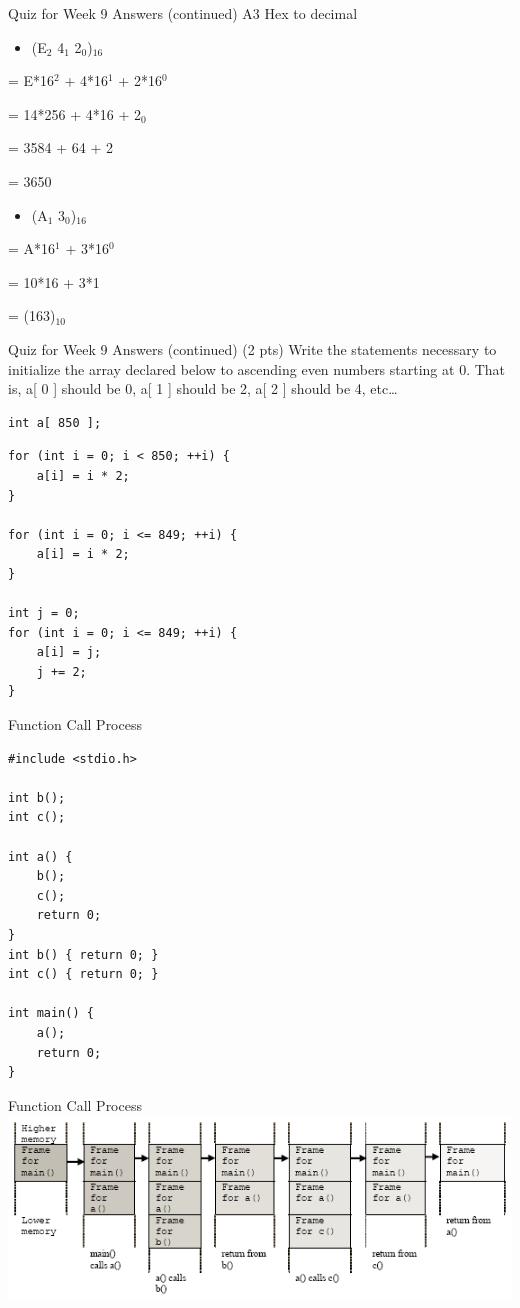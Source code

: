 \documentclass[presentation]{beamer}
\begin{document}
\begin{frame}[label=sec-3]{Quiz for Week 9 \alert{Answers} (continued)}
A3 Hex to decimal
\begin{itemize}
\item (E$_{\text{2}}$ 4$_{\text{1}}$ 2$_{\text{0}}$)$_{\text{16}}$
\end{itemize}
= E*16$^{\text{2}}$ + 4*16$^{\text{1}}$ + 2*16$^{\text{0}}$

= 14*256 + 4*16 + 2$_{\text{0}}$

= 3584 + 64 + 2

= 3650 
\begin{itemize}
\item (A$_{\text{1}}$ 3$_{\text{0}}$)$_{\text{16}}$
\end{itemize}
= A*16$^{\text{1}}$ + 3*16$^{\text{0}}$

= 10*16 + 3*1

= (163)$_{\text{10}}$
\end{frame}

\begin{frame}[fragile,label=sec-4]{Quiz for Week 9 \alert{Answers} (continued)}
 (2 pts) Write the statements necessary to initialize the array declared below to ascending even numbers starting at 0. That is, a[ 0 ] should be 0, a[ 1 ] should be 2, a[ 2 ] should be 4, etc\ldots{}
\begin{verbatim}
int a[ 850 ];
\end{verbatim}
\begin{verbatim}
for (int i = 0; i < 850; ++i) {
    a[i] = i * 2;
}  

for (int i = 0; i <= 849; ++i) {
    a[i] = i * 2;
}  

int j = 0;
for (int i = 0; i <= 849; ++i) {
    a[i] = j;
    j += 2;
}
\end{verbatim}
\end{frame}

\begin{frame}[fragile,label=sec-5]{Function Call Process}
 \begin{verbatim}
#include <stdio.h>

int b();
int c();

int a() {
    b();
    c();
    return 0;
}
int b() { return 0; }
int c() { return 0; }

int main() {
    a();
    return 0;
}
\end{verbatim}
\end{frame}

\begin{frame}[label=sec-6]{Function Call Process}
\includegraphics[width=.9\linewidth]{./func.png}
\end{frame}
\end{document}
